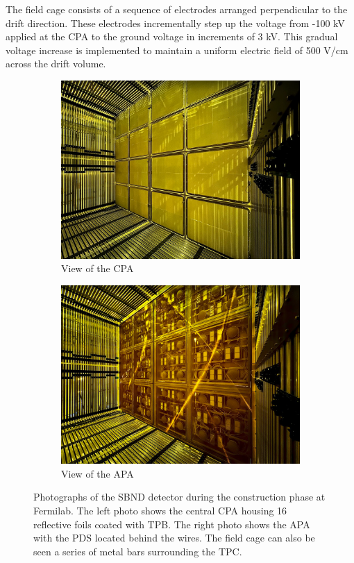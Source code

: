 The field cage consists of a sequence of electrodes arranged perpendicular to the drift direction. 
These electrodes incrementally step up the voltage from -100 kV applied at the CPA to the ground voltage in increments of 3 kV. 
This gradual voltage increase is implemented to maintain a uniform electric field of 500 V/cm across the drift volume.

\begin{figure}[htbp!]
\begin{subfigure}[h]{0.5\linewidth}
\centering    
\includegraphics[width=\linewidth]{SBND_CPA}
\caption{View of the CPA}
\end{subfigure}
\hfill
\begin{subfigure}[h]{0.5\linewidth}
\centering    
\includegraphics[width=\linewidth]{SBND_APA_PDS}
\caption{View of the APA}
\end{subfigure}%
\caption[SBND_CPA_APA]{
Photographs of the SBND detector during the construction phase at Fermilab. 
The left photo shows the central CPA housing 16 reflective foils coated with TPB.
The right photo shows the APA with the PDS located behind the wires.
The field cage can also be seen a series of metal bars surrounding the TPC.
}\label{fig:SBND_CPA_APA}
\end{figure}

